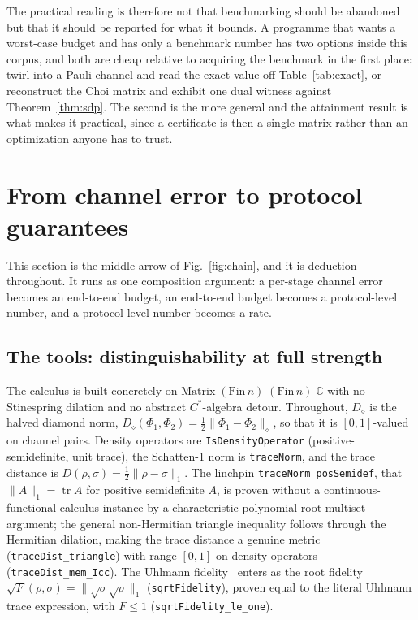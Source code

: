 \documentclass[aps,pra,reprint,nofootinbib,superscriptaddress]{revtex4-2}
\theoremstyle{plain}
\theoremstyle{definition}
\theoremstyle{remark}
\newcommand{\lean}[1]{\texttt{#1}}
\newcommand{\dnorm}[1]{\lVert #1 \rVert_{\diamond}}
\newcommand{\trnorm}[1]{\lVert #1 \rVert_{1}}
\newcommand{\ddist}{D_{\diamond}}
\begin{document}
The practical reading is therefore not that benchmarking should be
abandoned but that it should be reported for what it bounds. A programme
that wants a worst-case budget and has only a benchmark number has two
options inside this corpus, and both are cheap relative to acquiring the
benchmark in the first place: twirl into a Pauli channel and read the
exact value off Table~\ref{tab:exact}, or reconstruct the Choi matrix and
exhibit one dual witness against Theorem~\ref{thm:sdp}. The second is the
more general and the attainment result is what makes it practical, since
a certificate is then a single matrix rather than an optimization anyone
has to trust.

\section{From channel error to protocol guarantees}
\label{sec:protocol}

This section is the middle arrow of Fig.~\ref{fig:chain}, and it is
deduction throughout. It runs as one composition argument: a per-stage
channel error becomes an end-to-end budget, an end-to-end budget becomes
a protocol-level number, and a protocol-level number becomes a rate.

\subsection{The tools: distinguishability at full strength}

The calculus is built concretely on
$\mathrm{Matrix}\;(\mathrm{Fin}\,n)\;(\mathrm{Fin}\,n)\;\mathbb{C}$ with
no Stinespring dilation and no abstract $C^*$-algebra detour.
Throughout, $\ddist$ is the halved diamond norm,
$\ddist(\Phi_1,\Phi_2) = \tfrac12\dnorm{\Phi_1-\Phi_2}$, so that it is
$[0,1]$-valued on channel pairs. Density operators are
\lean{IsDensityOperator} (positive-semidefinite, unit trace), the
Schatten-1 norm is \lean{traceNorm}, and the trace distance is
$D(\rho,\sigma)=\tfrac12\trnorm{\rho-\sigma}$. The linchpin
\lean{traceNorm\_posSemidef}, that $\trnorm{A} = \operatorname{tr} A$ for
positive semidefinite $A$, is proven without a
continuous-functional-calculus instance by a characteristic-polynomial
root-multiset argument; the general non-Hermitian triangle inequality
follows through the Hermitian dilation, making the trace distance a
genuine metric (\lean{traceDist\_triangle}) with range $[0,1]$ on density
operators (\lean{traceDist\_mem\_Icc}). The Uhlmann
fidelity~\cite{Uhlmann1976} enters as the root fidelity
$\sqrt F(\rho,\sigma) = \trnorm{\sqrt\sigma\sqrt\rho}$
(\lean{sqrtFidelity}), proven equal to the literal Uhlmann trace
expression, with $F \le 1$ (\lean{sqrtFidelity\_le\_one}).
\end{document}
